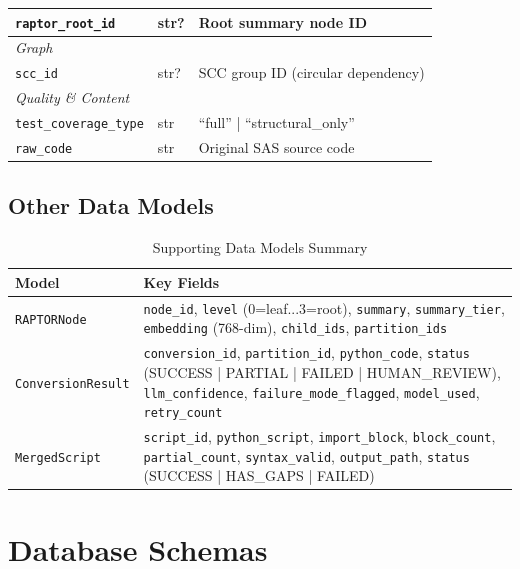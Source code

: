 \documentclass[11pt,a4paper]{article}
\begin{document}
\begin{table}[H]
\begin{tabularx}{\textwidth}{@{} l l X @{}}
\texttt{raptor\_root\_id} & str? & Root summary node ID \\
\midrule
\multicolumn{3}{l}{\textit{Graph}} \\
\texttt{scc\_id} & str? & SCC group ID (circular dependency) \\
\midrule
\multicolumn{3}{l}{\textit{Quality \& Content}} \\
\texttt{test\_coverage\_type} & str & ``full'' | ``structural\_only'' \\
\texttt{raw\_code} & str & Original SAS source code \\
\bottomrule
\end{tabularx}
\end{table}

\subsection{Other Data Models}

\begin{table}[H]
\centering
\caption{Supporting Data Models Summary}
\renewcommand{\arraystretch}{1.3}
\small
\begin{tabularx}{\textwidth}{@{} l X @{}}
\toprule
\textbf{Model} & \textbf{Key Fields} \\
\midrule
\texttt{RAPTORNode} & \texttt{node\_id}, \texttt{level} (0=leaf...3=root), \texttt{summary}, \texttt{summary\_tier}, \texttt{embedding} (768-dim), \texttt{child\_ids}, \texttt{partition\_ids} \\
\addlinespace
\texttt{ConversionResult} & \texttt{conversion\_id}, \texttt{partition\_id}, \texttt{python\_code}, \texttt{status} (SUCCESS | PARTIAL | FAILED | HUMAN\_REVIEW), \texttt{llm\_confidence}, \texttt{failure\_mode\_flagged}, \texttt{model\_used}, \texttt{retry\_count} \\
\addlinespace
\texttt{MergedScript} & \texttt{script\_id}, \texttt{python\_script}, \texttt{import\_block}, \texttt{block\_count}, \texttt{partial\_count}, \texttt{syntax\_valid}, \texttt{output\_path}, \texttt{status} (SUCCESS | HAS\_GAPS | FAILED) \\
\bottomrule
\end{tabularx}
\end{table}


\section{Database Schemas}
\end{document}
